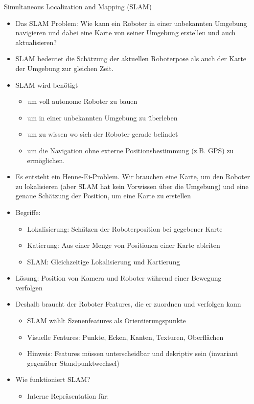 \documentclass[paper=a4, fontsize=11pt]{scrartcl} %
\numberwithin{equation}{section} %
\numberwithin{figure}{section} %
\numberwithin{table}{section} %
\begin{document}
Simultaneous Localization and Mapping (SLAM)
\begin{itemize}
\item Das SLAM Problem: Wie kann ein Roboter in einer unbekannten Umgebung navigieren und dabei eine Karte von seiner Umgebung erstellen und auch aktualisieren?
\item SLAM bedeutet die Schätzung der aktuellen Roboterpose als auch der Karte der Umgebung zur gleichen Zeit.
\item SLAM wird benötigt
\begin{itemize}
\item um voll autonome Roboter zu bauen
\item um in einer unbekannten Umgebung zu überleben
\item um zu wissen wo sich der Roboter gerade befindet
\item um die Navigation ohne externe Positionsbestimmung (z.B. GPS) zu ermöglichen.
\end{itemize}
\item Es entsteht ein Henne-Ei-Problem. Wir brauchen eine Karte, um den Roboter zu lokalisieren (aber SLAM hat kein Vorwissen über die Umgebung) und eine genaue Schätzung der Position, um eine Karte zu erstellen
\item Begriffe:
\begin{itemize}
\item Lokalisierung: Schätzen der Roboterposition bei gegebener Karte
\item Katierung: Aus einer Menge von Positionen einer Karte ableiten
\item SLAM: Gleichzeitige Lokalisierung und Kartierung
\end{itemize}
\item Lösung: Position von Kamera und Roboter während einer Bewegung verfolgen
\item Deshalb braucht der Roboter Features, die er zuordnen und verfolgen kann
\begin{itemize}
\item SLAM wählt Szenenfeatures als Orientierungspunkte
\item Visuelle Features: Punkte, Ecken, Kanten, Texturen, Oberflächen
\item Hinweis: Features müssen unterscheidbar und dekriptiv sein (invariant gegenüber Standpunktwechsel)
\end{itemize}
\item Wie funktioniert SLAM?
\begin{itemize}
\item Interne Repräsentation für:

\end{itemize}
\end{itemize}
\end{document}
